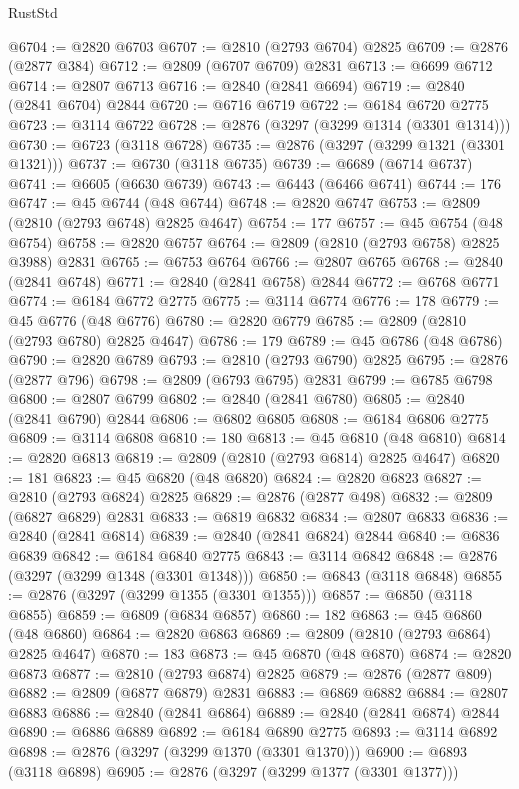 \begin{lexlean}{RustStd}
\begin{coremodule}
@6704 := @2820 @6703
@6707 := @2810 (@2793 @6704) @2825
@6709 := @2876 (@2877 @384)
@6712 := @2809 (@6707 @6709) @2831
@6713 := @6699 @6712
@6714 := @2807 @6713
@6716 := @2840 (@2841 @6694)
@6719 := @2840 (@2841 @6704) @2844
@6720 := @6716 @6719
@6722 := @6184 @6720 @2775
@6723 := @3114 @6722
@6728 := @2876 (@3297 (@3299 @1314 (@3301 @1314)))
@6730 := @6723 (@3118 @6728)
@6735 := @2876 (@3297 (@3299 @1321 (@3301 @1321)))
@6737 := @6730 (@3118 @6735)
@6739 := @6689 (@6714 @6737)
@6741 := @6605 (@6630 @6739)
@6743 := @6443 (@6466 @6741)
@6744 := 176
@6747 := @45 @6744 (@48 @6744)
@6748 := @2820 @6747
@6753 := @2809 (@2810 (@2793 @6748) @2825 @4647)
@6754 := 177
@6757 := @45 @6754 (@48 @6754)
@6758 := @2820 @6757
@6764 := @2809 (@2810 (@2793 @6758) @2825 @3988) @2831
@6765 := @6753 @6764
@6766 := @2807 @6765
@6768 := @2840 (@2841 @6748)
@6771 := @2840 (@2841 @6758) @2844
@6772 := @6768 @6771
@6774 := @6184 @6772 @2775
@6775 := @3114 @6774
@6776 := 178
@6779 := @45 @6776 (@48 @6776)
@6780 := @2820 @6779
@6785 := @2809 (@2810 (@2793 @6780) @2825 @4647)
@6786 := 179
@6789 := @45 @6786 (@48 @6786)
@6790 := @2820 @6789
@6793 := @2810 (@2793 @6790) @2825
@6795 := @2876 (@2877 @796)
@6798 := @2809 (@6793 @6795) @2831
@6799 := @6785 @6798
@6800 := @2807 @6799
@6802 := @2840 (@2841 @6780)
@6805 := @2840 (@2841 @6790) @2844
@6806 := @6802 @6805
@6808 := @6184 @6806 @2775
@6809 := @3114 @6808
@6810 := 180
@6813 := @45 @6810 (@48 @6810)
@6814 := @2820 @6813
@6819 := @2809 (@2810 (@2793 @6814) @2825 @4647)
@6820 := 181
@6823 := @45 @6820 (@48 @6820)
@6824 := @2820 @6823
@6827 := @2810 (@2793 @6824) @2825
@6829 := @2876 (@2877 @498)
@6832 := @2809 (@6827 @6829) @2831
@6833 := @6819 @6832
@6834 := @2807 @6833
@6836 := @2840 (@2841 @6814)
@6839 := @2840 (@2841 @6824) @2844
@6840 := @6836 @6839
@6842 := @6184 @6840 @2775
@6843 := @3114 @6842
@6848 := @2876 (@3297 (@3299 @1348 (@3301 @1348)))
@6850 := @6843 (@3118 @6848)
@6855 := @2876 (@3297 (@3299 @1355 (@3301 @1355)))
@6857 := @6850 (@3118 @6855)
@6859 := @6809 (@6834 @6857)
@6860 := 182
@6863 := @45 @6860 (@48 @6860)
@6864 := @2820 @6863
@6869 := @2809 (@2810 (@2793 @6864) @2825 @4647)
@6870 := 183
@6873 := @45 @6870 (@48 @6870)
@6874 := @2820 @6873
@6877 := @2810 (@2793 @6874) @2825
@6879 := @2876 (@2877 @809)
@6882 := @2809 (@6877 @6879) @2831
@6883 := @6869 @6882
@6884 := @2807 @6883
@6886 := @2840 (@2841 @6864)
@6889 := @2840 (@2841 @6874) @2844
@6890 := @6886 @6889
@6892 := @6184 @6890 @2775
@6893 := @3114 @6892
@6898 := @2876 (@3297 (@3299 @1370 (@3301 @1370)))
@6900 := @6893 (@3118 @6898)
@6905 := @2876 (@3297 (@3299 @1377 (@3301 @1377)))

\end{coremodule}
\end{lexlean}
